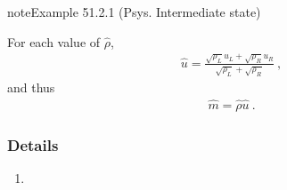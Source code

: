 \documentclass[letterpaper,10pt,english]{jupyterBook}
\begin{document}
\begin{sphinxadmonition}{note}{Example 51.2.1 (P\sphinxhyphen{}sys. Intermediate state)}



\sphinxAtStartPar
{} For each value of \(\hat{\rho}\),
\begin{equation*}
\begin{split}\hat{u} = \frac{\sqrt{\rho_L} u_L + \sqrt{\rho_R} u_R}{\sqrt{\rho_L} + \sqrt{\rho_R}} \ ,\end{split}
\end{equation*}
\sphinxAtStartPar
and thus
\begin{equation*}
\begin{split}\hat{m} = \hat{\rho} \hat{u} \ .\end{split}
\end{equation*}\subsubsection*{Details}
\begin{enumerate}
%
\setcounter{enumi}{2}
\item {} 
\sphinxAtStartPar
{}


\end{enumerate}
\end{sphinxadmonition}
\end{document}
